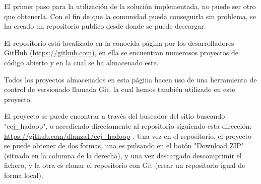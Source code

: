 El primer paso para la utilización de la solución implementada, no puede ser otro que obtenerla. Con el fin de que la comunidad pueda conseguirla sin problema, se ha creado un repositorio publico desde donde se puede descargar.

El repositorio est\'a localizado en la conocida p\'agina por los desarrolladores GitHub (\url{https://github.com}), en ella se encuentran numerosos proyectos de código abierto y en la cual se ha almacenado este.

Todos los proyectos almacenados en esta p\'agina hacen uso de una herramienta de control de versionado llamada Git, la cual hemos también utilizado en este proyecto.


El proyecto se puede encontrar a través del buscador del sitio buscando "ecj\_hadoop", o accediendo directamente al repositorio siguiendo esta dirección: \url{https://github.com/dlanza1/ecj_hadoop} . Una vez en el repositorio, el proyecto se puede obtener de dos formas, una es pulsando en el botón "Download ZIP" (situado en la columna de la derecha), y una vez descargado descomprimir el fichero, y la otra es clonar el repositorio con Git (crear un repositorio igual de forma local).


